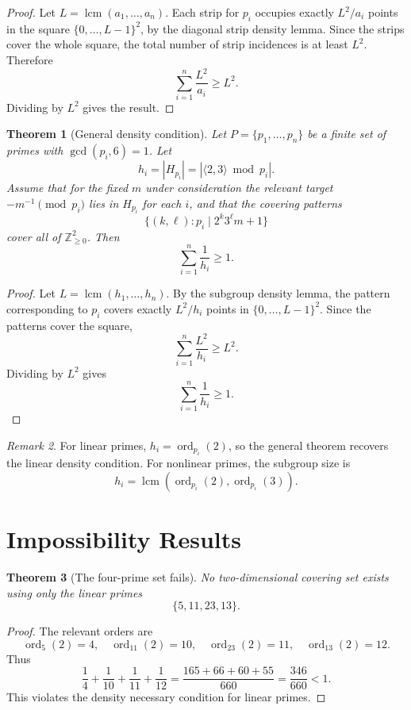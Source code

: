 \documentclass[11pt]{article}
\newtheorem{theorem}{Theorem}[section]
\theoremstyle{definition}
\theoremstyle{remark}
\newtheorem{remark}[theorem]{Remark}
\DeclareMathOperator{\ord}{ord}
\DeclareMathOperator{\lcm}{lcm}
\begin{document}
\begin{proof}
Let \(L=\lcm(a_1,\ldots,a_n)\).  Each strip for \(p_i\) occupies exactly
\(L^2/a_i\) points in the square \(\{0,\ldots,L-1\}^2\), by the diagonal strip
density lemma.  Since the strips cover the whole square, the total number of
strip incidences is at least \(L^2\).  Therefore
\[
        \sum_{i=1}^n \frac{L^2}{a_i}\geq L^2.
\]
Dividing by \(L^2\) gives the result.
\end{proof}

\begin{theorem}[General density condition]
Let \(P=\{p_1,\ldots,p_n\}\) be a finite set of primes with \(\gcd(p_i,6)=1\).
Let
\[
        h_i=|H_{p_i}|=|\langle 2,3\rangle \bmod p_i|.
\]
Assume that for the fixed \(m\) under consideration the relevant target
\(-m^{-1}\pmod {p_i}\) lies in \(H_{p_i}\) for each \(i\), and that the
covering patterns
\[
        \{(k,\ell):p_i\mid 2^k3^\ell m+1\}
\]
cover all of \(\mathbb Z_{\geq 0}^2\).  Then
\[
        \sum_{i=1}^n \frac1{h_i}\geq 1.
\]
\end{theorem}

\begin{proof}
Let \(L=\lcm(h_1,\ldots,h_n)\).  By the subgroup density lemma, the pattern
corresponding to \(p_i\) covers exactly \(L^2/h_i\) points in
\(\{0,\ldots,L-1\}^2\).  Since the patterns cover the square,
\[
        \sum_{i=1}^n \frac{L^2}{h_i}\geq L^2.
\]
Dividing by \(L^2\) gives
\[
        \sum_{i=1}^n \frac1{h_i}\geq 1.
\]
\end{proof}

\begin{remark}
For linear primes, \(h_i=\ord_{p_i}(2)\), so the general theorem recovers the
linear density condition.  For nonlinear primes, the subgroup size is
\[
        h_i=\lcm(\ord_{p_i}(2),\ord_{p_i}(3)).
\]
\end{remark}

\section{Impossibility Results}

\begin{theorem}[The four-prime set fails]
No two-dimensional covering set exists using only the linear primes
\[
        \{5,11,23,13\}.
\]
\end{theorem}

\begin{proof}
The relevant orders are
\[
        \ord_5(2)=4,\quad
        \ord_{11}(2)=10,\quad
        \ord_{23}(2)=11,\quad
        \ord_{13}(2)=12.
\]
Thus
\[
        \frac14+\frac1{10}+\frac1{11}+\frac1{12}
        =
        \frac{165+66+60+55}{660}
        =
        \frac{346}{660}
        <1.
\]
This violates the density necessary condition for linear primes.
\end{proof}
\end{document}
